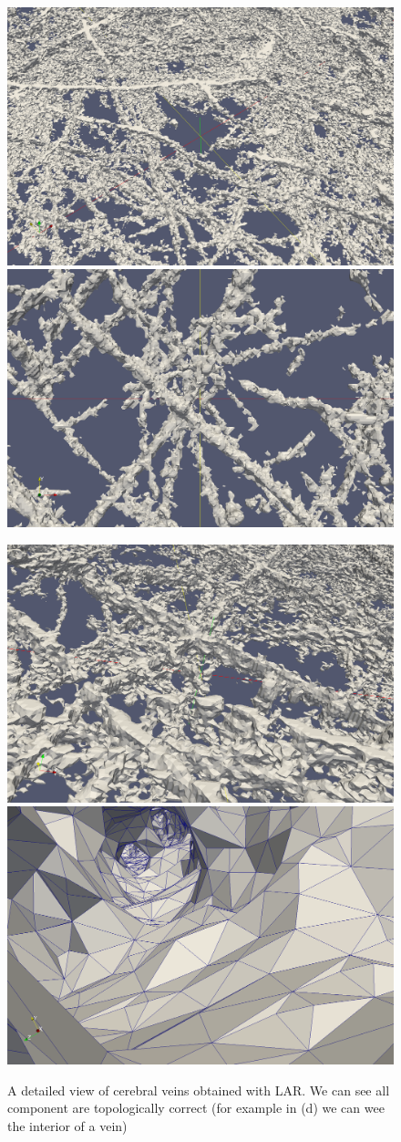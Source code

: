 \begin{figure}[htb] %
   \centering
   \includegraphics[width=0.49\linewidth]{images/NeuronsFil0.png}\hfill
   \includegraphics[width=0.49\linewidth]{images/NeuronsFil1.png}\newline
   
   \includegraphics[width=0.49\linewidth]{images/NeuronsFil2.png}\hfill
   \includegraphics[width=0.49\linewidth]{images/NeuronsFil3.png}
   \caption[A detailed view of cerebral veins with LAR]{A detailed view of cerebral veins obtained with LAR. We can see all component are topologically correct (for example in (d) we can wee the interior of a vein)}
   \label{fig:larModelNeurons}
\end{figure}